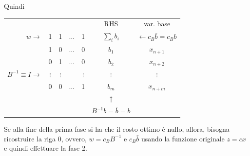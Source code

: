 Quindi
\begin{table}[h]
	\centering
	\begin{tabular}{r|cccc|c|c}
		\multicolumn{1}{c}{} & & & & \multicolumn{1}{c}{} & \multicolumn{1}{c}{RHS} & var. base \\ \cline{2-6}
		$w\rightarrow$ & 1 & 1 & $\dots$ & 1 & $\sum_{i}b_{i}$ & $\leftarrow c_{B}\bar{b}=c_{B}b$ \\ \cline{2-6}
		& 1 & 0 & $\dots$ & 0 & $b_{1}$ & $x_{n+1}$ \\
		& 0 & 1 & $\dots$ & 0 & $b_{2}$ & $x_{n+2}$ \\
		$B^{-1}\equiv I\rightarrow$ & $\vdots$ & $\vdots$ & & $\vdots$ & $\vdots$ & $\vdots$ \\
		& 0 & 0 & $\dots$ & 1 & $b_{m}$ & $x_{n+m}$ \\ \cline{2-6}
		\multicolumn{1}{c}{} & & & & \multicolumn{1}{c}{} & \multicolumn{1}{c}{$\uparrow$} & \multicolumn{1}{c}{} \\
		\multicolumn{1}{c}{} & & & & \multicolumn{1}{c}{} & \multicolumn{1}{c}{$B^{-1}b=\bar{b}=b$} & \\
	\end{tabular}
\end{table}

Se alla fine della prima fase si ha che il costo ottimo è nullo, allora, bisogna ricostruire la riga 0, ovvero, $w=c_{B}B^{-1}$ e $c_{B}\bar{b}$ usando la funzione originale $z=cx$ e quindi effettuare la fase 2.\\


